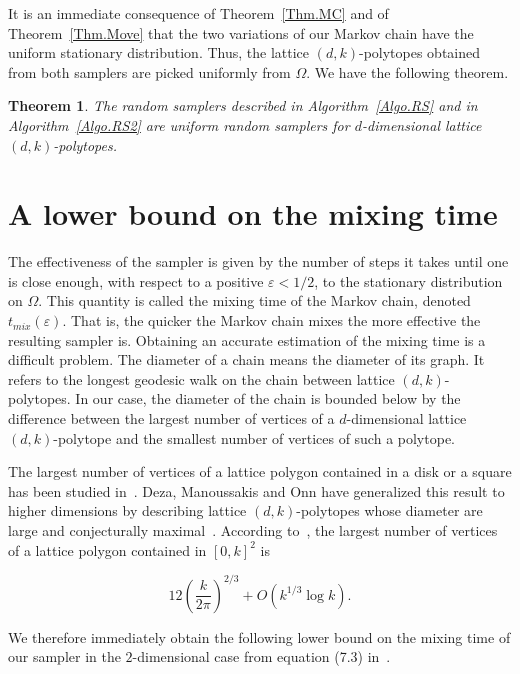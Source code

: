\documentclass[a4paper]{article}
\newtheorem{theorem}{Theorem}
\begin{document}
It is an immediate consequence of Theorem~\ref{Thm.MC} and of Theorem~\ref{Thm.Move} that the two variations of our Markov chain have the uniform stationary distribution. Thus, the lattice $(d,k)$-polytopes obtained from both samplers are picked uniformly from $\Omega$. We have the following theorem.

\begin{theorem}\label{Thm.RS}
  The random samplers described in Algorithm~\ref{Algo.RS} and in Algorithm~\ref{Algo.RS2} are uniform random samplers for $d$-dimensional lattice $(d,k)$-polytopes.
\end{theorem}

\section{A lower bound on the mixing time}\label{Sec.Mix}

The effectiveness of the sampler is given by the number of steps it takes until one is close enough, with respect to a positive $\varepsilon < 1/2$, to the stationary distribution on $\Omega$. This quantity is called the mixing time of the Markov chain, denoted $t_{mix}(\varepsilon)$. That is, the quicker the Markov chain mixes the more effective the resulting sampler is. Obtaining an accurate estimation of the mixing time is a difficult problem. The diameter of a chain means the diameter of its graph. It refers to the longest geodesic walk on the chain between lattice $(d,k)$-polytopes. In our case, the diameter of the chain is bounded below by the difference between the largest number of vertices of a $d$-dimensional lattice $(d,k)$-polytope and the smallest number of vertices of such a polytope.

The largest number of vertices of a lattice polygon contained in a disk or a square has been studied in~\cite{AcketaZunic1995,T91,BB91}. Deza, Manoussakis and Onn have generalized this result to higher dimensions by describing lattice $(d,k)$-polytopes whose diameter are large and conjecturally maximal~\cite{DezaManoussakisOnn2018}. According to~\cite{AcketaZunic1995}, the largest number of vertices of a lattice polygon contained in $[0,k]^2$ is

\begin{equation}\label{Eqn.Deza}
  12\left(\frac{k}{2\pi}\right)^{2/3}+O(k^{1/3}\log{k})\mbox{.}
\end{equation}

We therefore immediately obtain the following lower bound on the mixing time of our sampler in the $2$-dimensional case from equation (7.3) in~\cite{levin2009markov}.
\end{document}
